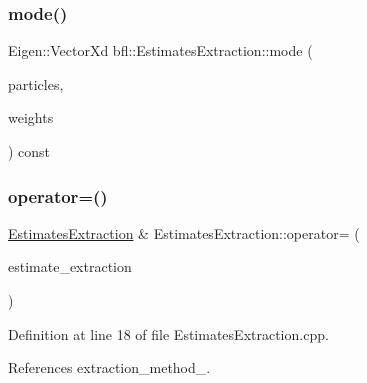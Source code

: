 \mbox{\label{classbfl_1_1EstimatesExtraction_ab8ea456201aa9546acb214dbc006384c}} 
\subsubsection{\texorpdfstring{mode()}{mode()}}
{\footnotesize\ttfamily Eigen\+::\+Vector\+Xd bfl\+::\+Estimates\+Extraction\+::mode (\begin{DoxyParamCaption}\item[{const Eigen\+::\+Ref$<$ const Eigen\+::\+Matrix\+Xd $>$ \&}]{particles,  }\item[{const Eigen\+::\+Ref$<$ const Eigen\+::\+Vector\+Xd $>$ \&}]{weights }\end{DoxyParamCaption}) const\hspace{0.3cm}{\ttfamily [protected]}}

\mbox{\label{classbfl_1_1EstimatesExtraction_ae473904953c7ad90408da2b4d3c14a1a}} 
\subsubsection{\texorpdfstring{operator=()}{operator=()}}
{\footnotesize\ttfamily \mbox{\hyperlink{classbfl_1_1EstimatesExtraction}{Estimates\+Extraction}} \& Estimates\+Extraction\+::operator= (\begin{DoxyParamCaption}\item[{\mbox{\hyperlink{classbfl_1_1EstimatesExtraction}{Estimates\+Extraction}} \&\&}]{estimate\+\_\+extraction }\end{DoxyParamCaption})\hspace{0.3cm}{\ttfamily [noexcept]}}



Definition at line 18 of file Estimates\+Extraction.\+cpp.



References extraction\+\_\+method\+\_\+.

\mbox{\label{classbfl_1_1EstimatesExtraction_a68bb4f3b41f578a38d9847b9c140c130}} 
